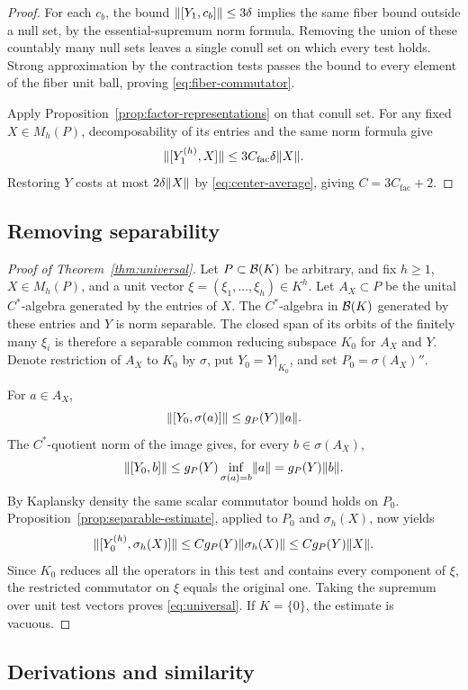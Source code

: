 \begin{proof}
For each $c_b$, the bound $\lVert[Y_1,c_b]\rVert\le3\delta$ implies the same
fiber bound outside a null set, by the essential-supremum norm formula.
Removing the union of these countably many null sets leaves a single
conull set on which every test holds.  Strong approximation by the
contraction tests passes the bound to every element of the fiber unit
ball, proving \eqref{eq:fiber-commutator}.

Apply Proposition~\ref{prop:factor-representations} on that conull set.
For any fixed $X\in M_h(P)$, decomposability of its entries and the same
norm formula give
\[
 \lVert[Y_1^{(h)},X]\rVert
 \le3C_{\mathrm{fac}}\delta\lVert X\rVert.
\]
Restoring $Y$ costs at most $2\delta\lVert X\rVert$ by
\eqref{eq:center-average}, giving $C=3C_{\mathrm{fac}}+2$.
\end{proof}

\subsection{Removing separability}

\begin{proof}[Proof of Theorem~\ref{thm:universal}]
Let $P\subset\mathcal B(K)$ be arbitrary, and fix $h\ge1$, $X\in M_h(P)$, and a
unit vector $\xi=(\xi_1,\ldots,\xi_h)\in K^h$.  Let $A_X\subset P$ be
the unital $C^*$-algebra generated by the entries of $X$.  The
$C^*$-algebra in $\mathcal B(K)$ generated by these entries and $Y$ is norm
separable.  The closed span of its orbits of the finitely many $\xi_i$
is therefore a separable common reducing subspace $K_0$ for $A_X$ and
$Y$.  Denote restriction of $A_X$ to $K_0$ by $\sigma$, put
$Y_0=Y|_{K_0}$, and set $P_0=\sigma(A_X)''$.

For $a\in A_X$,
\[
 \lVert[Y_0,\sigma(a)]\rVert\le g_P(Y)\lVert a\rVert.
\]
The $C^*$-quotient norm of the image gives, for every $b\in\sigma(A_X)$,
\[
 \lVert[Y_0,b]\rVert
 \le g_P(Y)\inf_{\sigma(a)=b}\lVert a\rVert
 =g_P(Y)\lVert b\rVert.
\]
By Kaplansky density the same scalar commutator bound holds on $P_0$.
Proposition~\ref{prop:separable-estimate}, applied to $P_0$ and
$\sigma_h(X)$, now yields
\[
 \lVert[Y_0^{(h)},\sigma_h(X)]\rVert
 \le C g_P(Y)\lVert\sigma_h(X)\rVert
 \le C g_P(Y)\lVert X\rVert.
\]
Since $K_0$ reduces all the operators in this test and contains every
component of $\xi$, the restricted commutator on $\xi$ equals the original
one.  Taking the supremum over unit test vectors proves
\eqref{eq:universal}.  If $K=\{0\}$, the estimate is vacuous.
\end{proof}

\subsection{Derivations and similarity}

